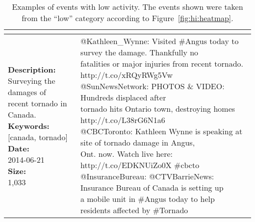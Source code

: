 \begin{table}
{\begin{tabular*}{1\linewidth}{p{5cm}p{5cm}}
{        %
      }
      \\
            \midrule
      \pbox{20cm}{\textbf{Description:}\\Surveying the damages of \\ recent tornado in Canada. \vspace{.1cm}\\
        \textbf{Keywords:}\\ {[}canada, tornado{]}\vspace{.1cm}\\
        \textbf{Date:}\\ 2014-06-21 \vspace{.1cm}\\
        \textbf{Size:}\\ 1,033}
      & \pbox{20cm}{
        @Kathleen\_Wynne: Visited \#Angus today to survey the damage. Thankfully no \\fatalities or major injuries from recent tornado. http://t.co/xRQyRWg5Vw\vspace{.1cm}\\
        @SunNewsNetwork: PHOTOS \& VIDEO: Hundreds displaced after \\ tornado hits Ontario town, destroying homes http://t.co/L38rG6N1a6\vspace{.1cm}\\
        @CBCToronto: Kathleen Wynne is speaking at site of tornado damage in Angus, \\Ont. now. Watch live here: http://t.co/EDKNUiZo0X \#cbcto\vspace{.1cm}\\
        @InsuranceBureau: @CTVBarrieNews: Insurance Bureau of Canada is setting up \\a mobile unit in \#Angus today to help residents affected by \#Tornado}
      \\
      \bottomrule
    \end{tabular*}
  } \caption[Examples of low-activity events]{Examples of events with low
  activity. The events shown were taken from the ``low'' category according to
  Figure~\ref{fig:hi:heatmap}.}
  \label{table:low-impact-sample}
\end{table}
